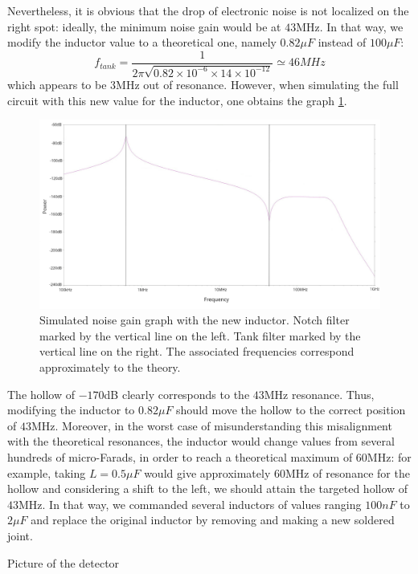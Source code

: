 \documentclass[11pt]{report}
\begin{document}
Nevertheless, it is obvious that the drop of electronic noise is not localized on the right spot: ideally, the minimum noise gain would be at $43$MHz. In that way, we modify the inductor value to a theoretical one, namely $0.82\mu F$ instead of $100\mu F$:
\begin{equation}
f_{tank} = \frac{1}{2\pi\sqrt{0.82 \times 10^{-6} \times 14 \times 10^{-12}}} \simeq 46MHz
\end{equation}
which appears to be $3$MHz out of resonance. However, when simulating the full circuit with this new value for the inductor, one obtains the graph \ref{fig:noise_gain_opamp_new}.
\begin{figure}[h!]
\centering
\includegraphics[width=\textwidth]{noise_gain_opamp_new}
\caption{Simulated noise gain graph with the new inductor. Notch filter marked by the vertical line on the left. Tank filter marked by the vertical line on the right. The associated frequencies correspond approximately to the theory.}
\label{fig:noise_gain_opamp_new}
\end{figure} The hollow of $-170$dB clearly corresponds to the $43$MHz resonance. Thus, modifying the inductor to $0.82\mu F$ should move the hollow to the correct position of $43$MHz. Moreover, in the worst case of misunderstanding this misalignment with the theoretical resonances, the inductor would change values from several hundreds of micro-Farads, in order to reach a theoretical maximum of $60$MHz: for example, taking $L=0.5\mu F$ would give approximately $60$MHz of resonance for the hollow and considering a shift to the left, we should attain the targeted hollow of $43$MHz. In that way, we commanded several inductors of values ranging $100nF$ to $2\mu F$ and replace the original inductor by removing and making a new soldered joint.

Picture of the detector
\end{document}
